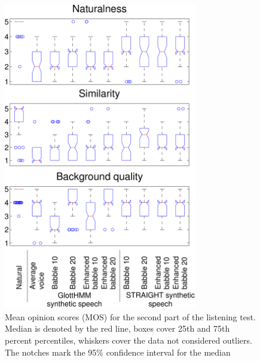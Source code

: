 \begin{figure}[!htb]
  \begin{centering}
  \includegraphics[width=0.75\textwidth]{images/all_subjective_test_quality.pdf}
  \caption{Mean opinion scores (MOS) for the second part of the listening test. Median is denoted by the red line, boxes cover 25th and 75th percent percentiles, whiskers cover the data not considered outliers. The notches mark the 95\% confidence interval for the median}
  \label{fig:mos_scores}
  \end{centering}
\end{figure}